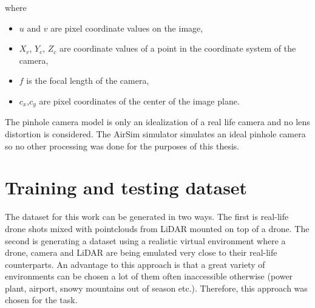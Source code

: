 \documentclass[twoside]{ctuthesis}
\theoremstyle{plain}
\theoremstyle{definition}
\theoremstyle{note}
\begin{document}
where
\begin{itemize}
	\item $u$ and $v$ are pixel coordinate values on the image,
	\item $X_c$, $Y_c$, $Z_c$ are coordinate values of a point in the coordinate system of the camera,
	\item $f$ is the focal length of the camera,
	\item $c_x$,$c_y$ are pixel coordinates of the center of the image plane.
\end{itemize}
The pinhole camera model is only an idealization of a real life camera and no lens distortion is considered. The AirSim simulator simulates an ideal pinhole camera so no other processing was done for the purposes of this thesis.
\section{Training and testing dataset} \label{s:2.6}
The dataset for this work can be generated in two ways. The first is real-life drone shots mixed with pointclouds from LiDAR mounted on top of a drone. The second is generating a dataset using a realistic virtual environment where a drone, camera and LiDAR are being emulated very close to their real-life counterparts. An advantage to this approach is that a great variety of environments can be chosen a lot of them often inaccessible otherwise (power plant, airport, snowy mountains out of season etc.). Therefore, this approach was chosen for the task.
\end{document}
